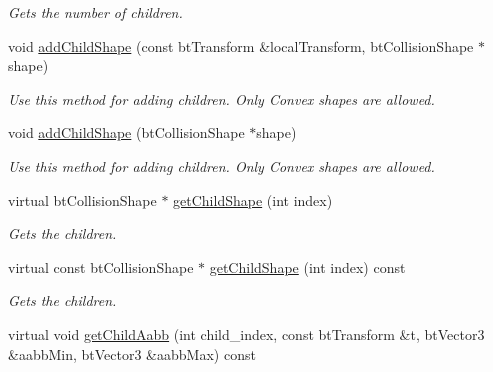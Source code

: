 \begin{DoxyCompactItemize}
\begin{DoxyCompactList}\small\item\em Gets the number of children. \end{DoxyCompactList}\item 
\hypertarget{classbt_g_impact_compound_shape_a3c97aab1f6511033df73007096ed4c8a}{void \hyperlink{classbt_g_impact_compound_shape_a3c97aab1f6511033df73007096ed4c8a}{add\+Child\+Shape} (const bt\+Transform \&local\+Transform, bt\+Collision\+Shape $\ast$shape)}\label{classbt_g_impact_compound_shape_a3c97aab1f6511033df73007096ed4c8a}

\begin{DoxyCompactList}\small\item\em Use this method for adding children. Only Convex shapes are allowed. \end{DoxyCompactList}\item 
\hypertarget{classbt_g_impact_compound_shape_a106e3d9999c847a9748c962378ab3f46}{void \hyperlink{classbt_g_impact_compound_shape_a106e3d9999c847a9748c962378ab3f46}{add\+Child\+Shape} (bt\+Collision\+Shape $\ast$shape)}\label{classbt_g_impact_compound_shape_a106e3d9999c847a9748c962378ab3f46}

\begin{DoxyCompactList}\small\item\em Use this method for adding children. Only Convex shapes are allowed. \end{DoxyCompactList}\item 
\hypertarget{classbt_g_impact_compound_shape_a91310884e33cfa7dc25d803ffb577ac0}{virtual bt\+Collision\+Shape $\ast$ \hyperlink{classbt_g_impact_compound_shape_a91310884e33cfa7dc25d803ffb577ac0}{get\+Child\+Shape} (int index)}\label{classbt_g_impact_compound_shape_a91310884e33cfa7dc25d803ffb577ac0}

\begin{DoxyCompactList}\small\item\em Gets the children. \end{DoxyCompactList}\item 
\hypertarget{classbt_g_impact_compound_shape_ad4edd755e27e6ff3fdf99b9bc811c749}{virtual const bt\+Collision\+Shape $\ast$ \hyperlink{classbt_g_impact_compound_shape_ad4edd755e27e6ff3fdf99b9bc811c749}{get\+Child\+Shape} (int index) const }\label{classbt_g_impact_compound_shape_ad4edd755e27e6ff3fdf99b9bc811c749}

\begin{DoxyCompactList}\small\item\em Gets the children. \end{DoxyCompactList}\item 
\hypertarget{classbt_g_impact_compound_shape_a9f43948dab925a6e75cd6062d084c27e}{virtual void \hyperlink{classbt_g_impact_compound_shape_a9f43948dab925a6e75cd6062d084c27e}{get\+Child\+Aabb} (int child\+\_\+index, const bt\+Transform \&t, bt\+Vector3 \&aabb\+Min, bt\+Vector3 \&aabb\+Max) const }\label{classbt_g_impact_compound_shape_a9f43948dab925a6e75cd6062d084c27e}


\end{DoxyCompactItemize}
